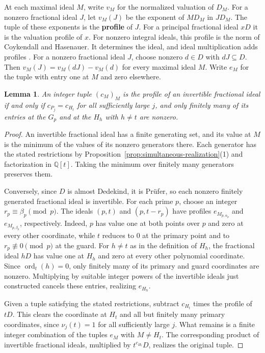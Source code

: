 \documentclass{article}
\DeclareMathOperator{\ord}{ord}
\newtheorem{lemma}[proposition]{Lemma}
\theoremstyle{remark}
\begin{document}
At each maximal ideal $M$, write $v_M$ for the normalized valuation of $D_M$.
For a nonzero fractional ideal $J$, let $v_M(J)$ be the exponent of $MD_M$ in $JD_M$.
The tuple of these exponents is the \textbf{profile} of $J$.
For a principal fractional ideal $xD$ it is the valuation profile of $x$.
For nonzero integral ideals, this profile is the norm of Coykendall and Hasenauer.
It determines the ideal, and ideal multiplication adds profiles \cite[Definition~2.8 and Theorems~2.9--2.10]{CH}.
For a nonzero fractional ideal $J$, choose nonzero $d \in D$ with $dJ \subseteq D$.
Then $v_M(J) = v_M(dJ) - v_M(d)$ for every maximal ideal $M$.
Write $e_M$ for the tuple with entry one at $M$ and zero elsewhere.

\begin{lemma}
    \label{lem:invertible-profiles}
    An integer tuple $(c_M)_M$ is the profile of an invertible fractional ideal if and only if $c_{P_j} = c_{H_t}$ for all sufficiently large $j$, and only finitely many of its entries at the $G_p$ and at the $H_h$ with $h \ne t$ are nonzero.
\end{lemma}

\begin{proof}
    An invertible fractional ideal has a finite generating set, and its value at $M$ is the minimum of the values of its nonzero generators there.
    Each generator has the stated restrictions by Proposition~\ref{prop:simultaneous-realization}(1) and factorization in $\mathbb{Q}[t]$.
    Taking the minimum over finitely many generators preserves them.

    Conversely, since $D$ is almost Dedekind, it is Pr\"ufer, so each nonzero finitely generated fractional ideal is invertible.
    For each prime $p$, choose an integer $r_p \equiv \beta_p \pmod{p}$.
    The ideals $(p, t)$ and $(p, t - r_p)$ have profiles $e_{M_{p, \alpha_p}}$ and $e_{M_{p, \beta_p}}$, respectively.
    Indeed, $p$ has value one at both points over $p$ and zero at every other coordinate, while $t$ reduces to $0$ at the primary point and to $r_p \not\equiv 0 \pmod{p}$ at the guard.
    For $h \ne t$ as in the definition of $H_h$, the fractional ideal $hD$ has value one at $H_h$ and zero at every other polynomial coordinate.
    Since $\ord_t(h) = 0$, only finitely many of its primary and guard coordinates are nonzero.
    Multiplying by suitable integer powers of the invertible ideals just constructed cancels these entries, realizing $e_{H_h}$.

    Given a tuple satisfying the stated restrictions, subtract $c_{H_t}$ times the profile of $tD$.
    This clears the coordinate at $H_t$ and all but finitely many primary coordinates, since $\nu_j(t) = 1$ for all sufficiently large $j$.
    What remains is a finite integer combination of the tuples $e_M$ with $M \ne H_t$.
    The corresponding product of invertible fractional ideals, multiplied by $t^{c_{H_t}}D$, realizes the original tuple.
\end{proof}
\end{document}
